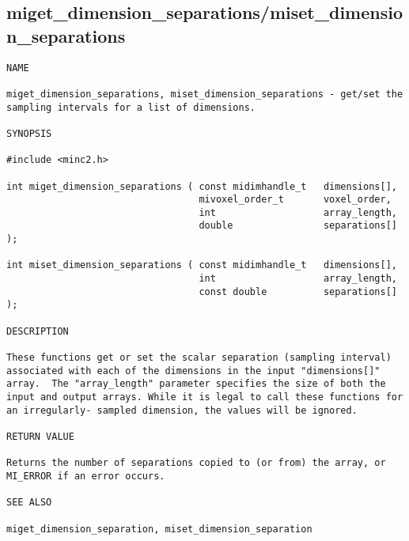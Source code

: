 \documentclass{article}
\begin{document}
\subsection{miget\_dimension\_separations/miset\_dimension\_separations}
\begin{verbatim}
NAME

miget_dimension_separations, miset_dimension_separations - get/set the
sampling intervals for a list of dimensions.

SYNOPSIS

#include <minc2.h>

int miget_dimension_separations ( const midimhandle_t   dimensions[],
                                  mivoxel_order_t       voxel_order,
                                  int                   array_length,
                                  double                separations[] );

int miset_dimension_separations ( const midimhandle_t   dimensions[],
                                  int                   array_length,
                                  const double          separations[] );

DESCRIPTION

These functions get or set the scalar separation (sampling interval)
associated with each of the dimensions in the input "dimensions[]"
array.  The "array_length" parameter specifies the size of both the
input and output arrays. While it is legal to call these functions for
an irregularly- sampled dimension, the values will be ignored.

RETURN VALUE

Returns the number of separations copied to (or from) the array, or
MI_ERROR if an error occurs.

SEE ALSO

miget_dimension_separation, miset_dimension_separation
\end{verbatim}
\end{document}

